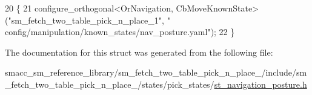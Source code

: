 \begin{DoxyCode}
20     \{
21         configure\_orthogonal<OrNavigation, CbMoveKnownState>(\textcolor{stringliteral}{"sm\_fetch\_two\_table\_pick\_n\_place\_1"}, \textcolor{stringliteral}{"
      config/manipulation/known\_states/nav\_posture.yaml"});
22     \}
\end{DoxyCode}


The documentation for this struct was generated from the following file\+:\begin{DoxyCompactItemize}
\item 
smacc\+\_\+sm\+\_\+reference\+\_\+library/sm\+\_\+fetch\+\_\+two\+\_\+table\+\_\+pick\+\_\+n\+\_\+place\+\_/include/sm\+\_\+fetch\+\_\+two\+\_\+table\+\_\+pick\+\_\+n\+\_\+place\+\_/states/pick\+\_\+states/\hyperlink{sm__fetch__two__table__pick__n__place__1_2include_2sm__fetch__two__table__pick__n__place__1_2sta1608e8dd04667db37e6488e04eb1a2d9}{st\+\_\+navigation\+\_\+posture.\+h}\end{DoxyCompactItemize}
